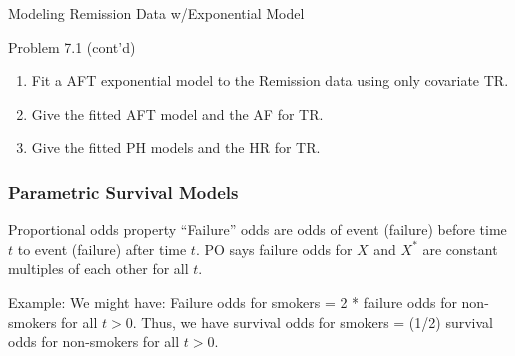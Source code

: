 \documentclass{beamer}
\theoremstyle{definition}
\begin{document}
 \begin{frame}{Modeling Remission Data w/Exponential Model}
\begin{block}{Problem 7.1 (cont'd)}
\begin{enumerate}
\item Fit a AFT exponential model to the Remission data using only covariate TR.
\item Give the fitted AFT model and the AF for TR.
\item Give the fitted PH models and the HR  for TR.
\end{enumerate}
 \end{block}
 \end{frame}



\begin{frame}
\frametitle{Parametric Survival Models}
\begin{block}{Proportional odds property}
``Failure'' odds are odds of event (failure) before time $t$ to event (failure) after time $t$. PO says failure odds for $X$ and $X^*$ are constant multiples of each other for all $t$.
\vspace{10pt}

Example: We might have: Failure odds for smokers = 2 * failure odds for non-smokers for all $t>0$. Thus, we have survival odds for smokers = (1/2) survival odds for non-smokers for all $t>0$.
\end{block}
\end{frame}
\end{document}
